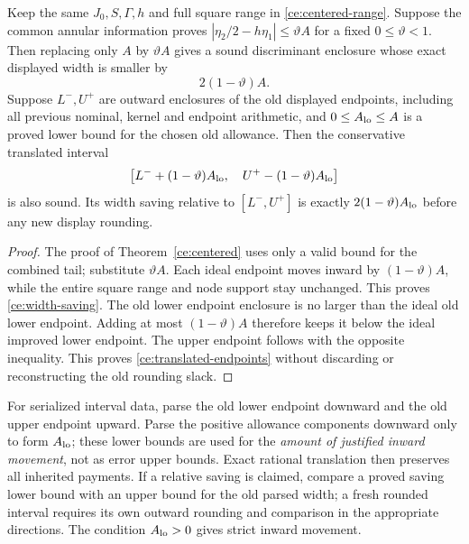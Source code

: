 \begin{theorem}
\label{ce:complete-width}
Keep the same $J_0,S,\Gamma,h$ and full square range in
\eqref{ce:centered-range}. Suppose the common annular information proves
$|\eta_2/2-h\eta_1|\le\vartheta A$ for a fixed $0\le\vartheta<1$.
Then replacing only $A$ by $\vartheta A$ gives a sound discriminant
enclosure whose exact displayed width is smaller by
\begin{equation}
 2(1-\vartheta)A.
 \label{ce:width-saving}
\end{equation}
Suppose $L^-,U^+$ are outward enclosures of the old displayed endpoints,
including all previous nominal, kernel and endpoint arithmetic, and
$0\le A_{\rm lo}\le A$ is a proved lower bound for the chosen old
allowance. Then the conservative translated interval
\begin{equation}
 \bigl[L^-+(1-\vartheta)A_{\rm lo},\quad
       U^+-(1-\vartheta)A_{\rm lo}\bigr]
 \label{ce:translated-endpoints}
\end{equation}
is also sound. Its width saving relative to $[L^-,U^+]$ is exactly
$2(1-\vartheta)A_{\rm lo}$ before any new display rounding.
\end{theorem}
\begin{proof}
The proof of Theorem~\ref{ce:centered} uses only a valid bound for the
combined tail; substitute $\vartheta A$. Each ideal endpoint moves
inward by $(1-\vartheta)A$, while the entire square range and node
support stay unchanged. This proves \eqref{ce:width-saving}.
The old lower endpoint enclosure is no larger than the ideal old lower
endpoint. Adding at most $(1-\vartheta)A$ therefore keeps it below the
ideal improved lower endpoint. The upper endpoint follows with the
opposite inequality. This proves \eqref{ce:translated-endpoints} without
discarding or reconstructing the old rounding slack.
\end{proof}

For serialized interval data, parse the old lower endpoint downward and
the old upper endpoint upward. Parse the positive allowance components
downward only to form $A_{\rm lo}$; these lower bounds are used for the
\emph{amount of justified inward movement}, not as error upper bounds.
Exact rational translation then preserves all inherited payments.
If a relative saving is claimed, compare a proved saving lower bound
with an upper bound for the old parsed width; a fresh rounded interval
requires its own outward rounding and comparison in the appropriate
directions. The condition $A_{\rm lo}>0$ gives strict inward movement.

